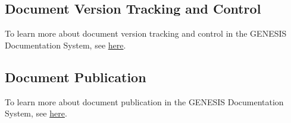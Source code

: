 \documentclass[12pt]{article}
\begin{document}
\subsection*{Document Version Tracking and Control}

To learn more about document version tracking and control in the GENESIS Documentation System, see \href{../document-versionctrl/document-versionctrl.pdf}{here}.

\subsection*{Document Publication}

To learn more about document publication in the GENESIS Documentation System, see \href{../document-publication/document-publication.pdf}{here}.
\end{document}
